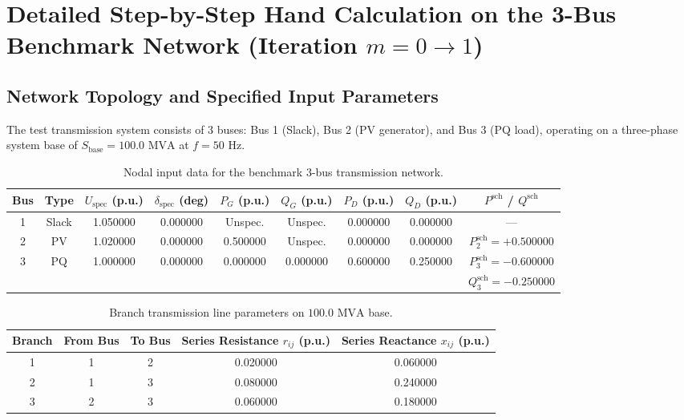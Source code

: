 \documentclass[12pt,a4paper,oneside]{report}
\begin{document}
\section{Detailed Step-by-Step Hand Calculation on the 3-Bus Benchmark Network (Iteration $m = 0 \to 1$)}

\subsection{Network Topology and Specified Input Parameters}
The test transmission system consists of 3 buses: Bus 1 (Slack), Bus 2 (PV generator), and Bus 3 (PQ load), operating on a three-phase system base of $S_{\text{base}} = 100.0\text{ MVA}$ at $f = 50\text{ Hz}$.

\begin{table}[H]
\centering
\caption{Nodal input data for the benchmark 3-bus transmission network.}
\label{tab:3bus_bus_data}
\begin{tabular}{ccccccccc}
\toprule
\textbf{Bus} & \textbf{Type} & \textbf{$U_{\text{spec}}$ (p.u.)} & \textbf{$\delta_{\text{spec}}$ (deg)} & \textbf{$P_G$ (p.u.)} & \textbf{$Q_G$ (p.u.)} & \textbf{$P_D$ (p.u.)} & \textbf{$Q_D$ (p.u.)} & \textbf{$P^{\text{sch}}$ / $Q^{\text{sch}}$} \\
\midrule
1 & Slack & 1.050000 & 0.000000 & Unspec. & Unspec. & 0.000000 & 0.000000 & --- \\
2 & PV & 1.020000 & 0.000000 & 0.500000 & Unspec. & 0.000000 & 0.000000 & $P_2^{\text{sch}} = +0.500000$ \\
3 & PQ & 1.000000 & 0.000000 & 0.000000 & 0.000000 & 0.600000 & 0.250000 & $P_3^{\text{sch}} = -0.600000$ \\
  &    &          &          &          &          &          &          & $Q_3^{\text{sch}} = -0.250000$ \\
\bottomrule
\end{tabular}
\end{table}

\begin{table}[H]
\centering
\caption{Branch transmission line parameters on $100.0\text{ MVA}$ base.}
\label{tab:3bus_line_data}
\begin{tabular}{ccccc}
\toprule
\textbf{Branch} & \textbf{From Bus} & \textbf{To Bus} & \textbf{Series Resistance $r_{ij}$ (p.u.)} & \textbf{Series Reactance $x_{ij}$ (p.u.)} \\
\midrule
1 & 1 & 2 & 0.020000 & 0.060000 \\
2 & 1 & 3 & 0.080000 & 0.240000 \\
3 & 2 & 3 & 0.060000 & 0.180000 \\
\bottomrule
\end{tabular}
\end{table}
\end{document}
